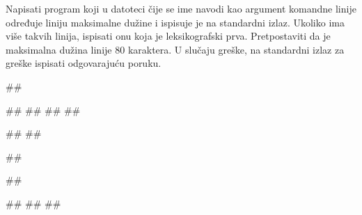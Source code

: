 \begin{Exercise}[label=v3_02] 
Napisati program koji u datoteci čije se ime navodi kao argument komandne 
linije određuje liniju maksimalne dužine i ispisuje je na standardni izlaz. 
Ukoliko ima više takvih linija, ispisati onu koja je leksikografski prva. 
Pretpostaviti da je maksimalna dužina linije $80$ karaktera.
U slučaju greške, na standardni izlaz za greške ispisati odgovarajuću poruku.

\begin{miditest}
\begin{upotreba}{1}
##

##
##
##
##

#\naslovIzlaz#
##
\end{upotreba}
\end{miditest}
\begin{minitest}
\begin{upotreba}{2}
##

##

#\naslovIzlazZaGresku#
##
##
\end{upotreba}
\end{minitest}

\end{Exercise}
\begin{Answer}[ref=v3_02]
\end{Answer}


